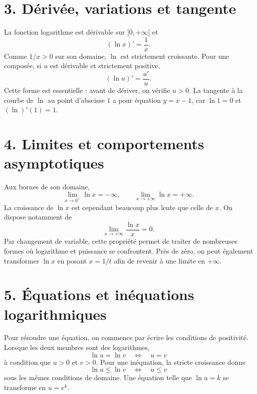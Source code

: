 
\section{3. Dérivée, variations et tangente}
La fonction logarithme est dérivable sur $]0,+\infty[$ et
\[
(\ln x)'=\frac1x.
\]
Comme $1/x>0$ sur son domaine, $\ln$ est strictement croissante. Pour une composée, si $u$ est dérivable et strictement positive,
\[
(\ln u)'=\frac{u'}{u}.
\]
Cette forme est essentielle : avant de dériver, on vérifie $u>0$. La tangente à la courbe de $\ln$ au point d’abscisse $1$ a pour équation $y=x-1$, car $\ln 1=0$ et $(\ln)'(1)=1$.

\section{4. Limites et comportements asymptotiques}
Aux bornes de son domaine,
\[
\lim_{x\to0^+}\ln x=-\infty,\qquad \lim_{x\to+\infty}\ln x=+\infty.
\]
La croissance de $\ln x$ est cependant beaucoup plus lente que celle de $x$. On dispose notamment de
\[
\lim_{x\to+\infty}\frac{\ln x}{x}=0.
\]
Par changement de variable, cette propriété permet de traiter de nombreuses formes où logarithme et puissance se confrontent. Près de zéro, on peut également transformer $\ln x$ en posant $x=1/t$ afin de revenir à une limite en $+\infty$.


\section{5. Équations et inéquations logarithmiques}
Pour résoudre une équation, on commence par écrire les conditions de positivité. Lorsque les deux membres sont des logarithmes,
\[
\ln u=\ln v\quad\Longleftrightarrow\quad u=v
\]
à condition que $u>0$ et $v>0$. Pour une inéquation, la stricte croissance donne
\[
\ln u\leq \ln v\quad\Longleftrightarrow\quad u\leq v
\]
sous les mêmes conditions de domaine. Une équation telle que $\ln u=k$ se transforme en $u=e^k$.

